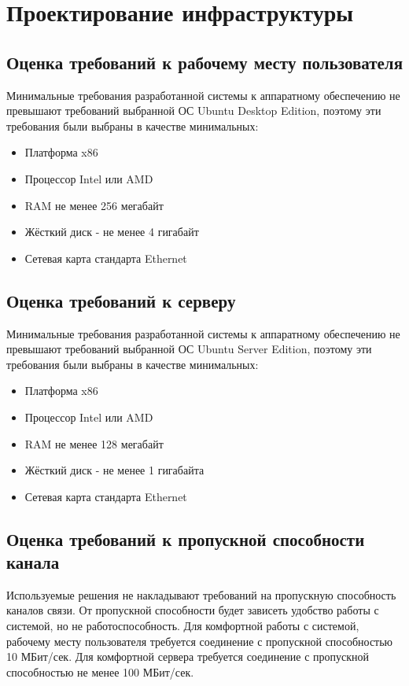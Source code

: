 \documentclass[utf8,usehyperref,12pt]{G7-32}
\begin{document}
\section{Проектирование инфраструктуры}

\subsection{Оценка требований к рабочему месту пользователя}
Минимальные требования разработанной системы к аппаратному обеспечению не превышают требований выбранной ОС Ubuntu Desktop Edition\cite{ubuntu_req}, поэтому эти требования были выбраны в качестве минимальных:
\begin{itemize}
 \item Платформа x86
 \item Процессор Intel или AMD
 \item RAM не менее 256 мегабайт
 \item Жёсткий диск - не менее 4 гигабайт
 \item Сетевая карта стандарта Ethernet
\end{itemize}

\subsection{Оценка требований к серверу}

Минимальные требования разработанной системы к аппаратному обеспечению не превышают требований выбранной ОС Ubuntu Server Edition\cite{ubuntu_server_req}, поэтому эти требования были выбраны в качестве минимальных:
\begin{itemize}
 \item Платформа x86
 \item Процессор Intel или AMD
 \item RAM не менее 128 мегабайт
 \item Жёсткий диск - не менее 1 гигабайта
 \item Сетевая карта стандарта Ethernet
\end{itemize}

\subsection{Оценка требований к пропускной способности канала}
Используемые решения не накладывают требований на пропускную способность каналов связи. От пропускной способности будет зависеть удобство работы с системой, но не работоспособность. Для комфортной работы с системой, рабочему месту пользователя требуется соединение с пропускной способностью 10 МБит/сек. Для комфортной сервера требуется соединение с пропускной способностью не менее 100 МБит/сек.
\end{document}
